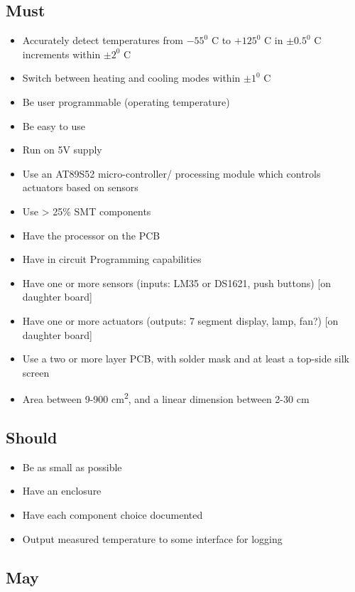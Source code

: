 \documentclass[11pt]{article}
\begin{document}
\subsection*{Must}
\begin{itemize}
    \item Accurately detect temperatures from $-55^0$ C to $+125^0$ C  in $\pm 0.5^0$ C increments within $\pm 2^0$ C
\item Switch between heating and cooling modes within $\pm 1^0$ C
\item Be user programmable (operating temperature)
\item Be easy to use
\item Run on 5V supply
\item Use an AT89S52 micro-controller/ processing module which controls actuators based on sensors
\item Use > 25\% SMT components
\item Have the processor on the PCB 
\item Have in circuit Programming capabilities
\item Have one or more sensors (inputs: LM35 or DS1621, push buttons) [on daughter board]
\item Have one or more actuators (outputs: 7 segment display, lamp, fan?) [on daughter board]
\item Use a two or more layer PCB, with solder mask and at least a top-side silk screen
\item Area between 9-900 cm\textsuperscript{2}, and a linear dimension between 2-30 cm
\end{itemize}

\subsection*{Should}

\begin{itemize}
    \item Be as small as possible
\item Have an enclosure
\item Have each component choice documented
\item Output measured temperature to some interface for logging
\end{itemize}
		
\subsection*{May}
\end{document}
